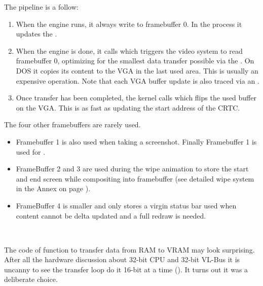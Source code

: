 \par
The pipeline is a follow:
\begin{enumerate}
\item When the engine runs, it always write to framebuffer 0. In the process it updates the .
\item When the engine is done, it calls  which triggers the video system to read framebuffer 0, optimizing for the smallest data transfer possible via the . On DOS it copies its content to the VGA in the last used area. This is usually an expensive operation. Note that each VGA buffer update is also traced via an .
\item Once transfer has been completed, the kernel calls   which flips the used buffer on the VGA. This is as fast as updating the start address of the CRTC.
\end{enumerate}
\par
The four other framebuffers are rarely used.
\begin{itemize} 
\item Framebuffer 1 is also used when taking a screenshot. Finally Framebuffer 1 is used for .

\item FrameBuffer 2 and 3 are used during the wipe animation to store the start and end screen while compositing into framebuffer (see detailed wipe system in the Annex on page \pageref{label_melt}). 
\item FrameBuffer 4 is smaller and only stores a virgin status bar used when content cannot be delta updated and a full redraw is needed. 
\end{itemize}
\par

\\
\par
{}
\par
The code of function  to transfer data from RAM to VRAM may look surprising. After all the hardware discussion about 32-bit CPU and 32-bit VL-Bus it is uncanny to see the transfer loop do it 16-bit at a time (). It turns out it was a deliberate choice.\\
\par
{}
\par
{}
\par